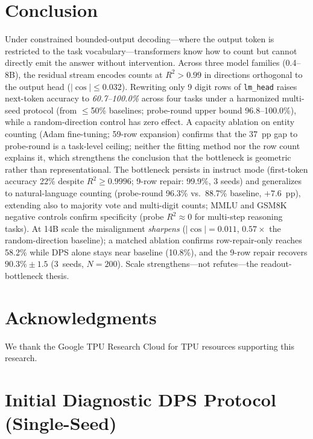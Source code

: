\documentclass{article}
\begin{document}
\section*{Conclusion}

Under constrained bounded-output decoding---where the output token is restricted to the task vocabulary---transformers know how to count but cannot directly emit the answer without intervention.
Across three model families (0.4--8B), the residual stream encodes counts at $R^2>0.99$
in directions orthogonal to the output head ($|\cos| \leq 0.032$).
Rewriting only 9 digit rows of \texttt{lm\_head} raises next-token accuracy to
\emph{60.7--100.0\%} across four tasks under a harmonized multi-seed protocol
(from $\leq$50\% baselines; probe-round upper bound 96.8--100.0\%),
while a random-direction control has zero effect.
A capacity ablation on entity counting (Adam fine-tuning; 59-row expansion) confirms
that the 37~pp gap to probe-round is a task-level ceiling; neither the fitting method
nor the row count explains it, which strengthens the conclusion that the bottleneck is
geometric rather than representational.
The bottleneck persists in instruct mode (first-token accuracy 22\% despite
$R^2 \geq 0.9996$; 9-row repair: 99.9\%, 3 seeds) and generalizes to
natural-language counting (probe-round 96.3\% vs.\ 88.7\% baseline, $+7.6$~pp),
extending also to majority vote and multi-digit counts; MMLU and GSM8K negative
controls confirm specificity (probe $R^2 \approx 0$ for multi-step reasoning tasks).
At 14B scale the misalignment \emph{sharpens} ($|\cos|{=}0.011$, $0.57\times$ the
random-direction baseline); a matched ablation confirms row-repair-only reaches 58.2\%
while DPS alone stays near baseline (10.8\%), and the 9-row repair recovers
$90.3\% \pm 1.5$ (3~seeds, $N{=}200$). Scale strengthens---not refutes---the readout-bottleneck thesis.

\section*{Acknowledgments}
We thank the Google TPU Research Cloud for TPU resources supporting this research.




\appendix

\section{Initial Diagnostic DPS Protocol (Single-Seed)}
\label{sec:dps_initial}
\end{document}

